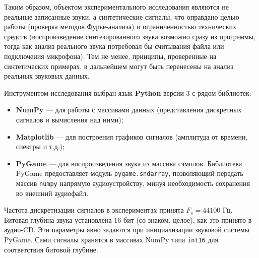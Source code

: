 \documentclass[bachelor, och, diploma]{SCWorks}
\begin{document}
Таким образом, объектом экспериментального исследования являются не реальные записанные звуки, а синтетические сигналы, что оправдано целью работы (проверка методов Фурье-анализа) и ограниченностью технических средств (воспроизведение синтезированного звука возможно сразу из программы, тогда как анализ реального звука потребовал бы считывания файла или подключения микрофона). Тем не менее, принципы, проверенные на синтетических примерах, в дальнейшем могут быть перенесены на анализ реальных звуковых данных.

Инструментом исследования выбран язык \textbf{Python} версии 3 с рядом библиотек:
\begin{itemize}
    \item \textbf{NumPy} --- для работы с массивами данных (представления дискретных сигналов и вычисления над ними);
    \item \textbf{Matplotlib} --- для построения графиков сигналов (амплитуда от времени, спектры и т.д.);
    \item \textbf{PyGame} --- для воспроизведения звука из массива сэмплов. Библиотека PyGame предоставляет модуль \texttt{pygame.sndarray}, позволяющий передать массив \texttt{numpy} напрямую аудиоустройству, минуя необходимость сохранения во внешний аудиофайл.
\end{itemize}

Частота дискретизации сигналов в экспериментах принята $F_s = 44100$ Гц. Битовая глубина звука установлена 16 бит (со знаком, целое), как это принято в аудио-CD. Эти параметры явно задаются при инициализации звуковой системы PyGame. Сами сигналы хранятся в массивах NumPy типа \texttt{int16} для соответствия битовой глубине.
\end{document}
